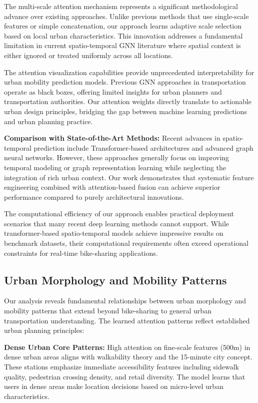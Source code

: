\documentclass[sigconf,review,nonacm]{acmart}
\begin{document}
The multi-scale attention mechanism represents a significant methodological advance over existing approaches. Unlike previous methods that use single-scale features or simple concatenation, our approach learns adaptive scale selection based on local urban characteristics. This innovation addresses a fundamental limitation in current spatio-temporal GNN literature where spatial context is either ignored or treated uniformly across all locations.

The attention visualization capabilities provide unprecedented interpretability for urban mobility prediction models. Previous GNN approaches in transportation operate as black boxes, offering limited insights for urban planners and transportation authorities. Our attention weights directly translate to actionable urban design principles, bridging the gap between machine learning predictions and urban planning practice.

\textbf{Comparison with State-of-the-Art Methods:}
Recent advances in spatio-temporal prediction include Transformer-based architectures and advanced graph neural networks. However, these approaches generally focus on improving temporal modeling or graph representation learning while neglecting the integration of rich urban context. Our work demonstrates that systematic feature engineering combined with attention-based fusion can achieve superior performance compared to purely architectural innovations.

The computational efficiency of our approach enables practical deployment scenarios that many recent deep learning methods cannot support. While transformer-based spatio-temporal models achieve impressive results on benchmark datasets, their computational requirements often exceed operational constraints for real-time bike-sharing applications.

\subsection{Urban Morphology and Mobility Patterns}

Our analysis reveals fundamental relationships between urban morphology and mobility patterns that extend beyond bike-sharing to general urban transportation understanding. The learned attention patterns reflect established urban planning principles:

\textbf{Dense Urban Core Patterns:}
High attention on fine-scale features (500m) in dense urban areas aligns with walkability theory and the 15-minute city concept. These stations emphasize immediate accessibility features including sidewalk quality, pedestrian crossing density, and retail diversity. The model learns that users in dense areas make location decisions based on micro-level urban characteristics.
\end{document}
